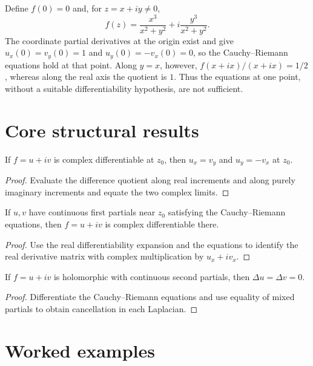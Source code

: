 \begin{example}\label{ex:iv02-expand-03}
Define \(f(0)=0\) and, for \(z=x+iy\ne0\),
\[
f(z)=\frac{x^3}{x^2+y^2}+i\frac{y^3}{x^2+y^2}.
\]
The coordinate partial derivatives at the origin exist and give \(u_x(0)=v_y(0)=1\) and \(u_y(0)=-v_x(0)=0\), so the Cauchy--Riemann equations hold at that point. Along \(y=x\), however, \(f(x+ix)/(x+ix)=1/2\), whereas along the real axis the quotient is \(1\). Thus the equations at one point, without a suitable differentiability hypothesis, are not sufficient.
\end{example}
\section{Core structural results}

\begin{theorem}\label{thm:iv02-01}
If $f=u+iv$ is complex differentiable at $z_0$, then $u_x=v_y$ and $u_y=-v_x$ at $z_0$.
\begin{proof}
Evaluate the difference quotient along real increments and along purely imaginary increments and equate the two complex limits.
\end{proof}
\end{theorem}

\begin{theorem}\label{thm:iv02-02}
If $u,v$ have continuous first partials near $z_0$ satisfying the Cauchy--Riemann equations, then $f=u+iv$ is complex differentiable there.
\begin{proof}
Use the real differentiability expansion and the equations to identify the real derivative matrix with complex multiplication by $u_x+iv_x$.
\end{proof}
\end{theorem}

\begin{theorem}[Harmonicity]\label{thm:iv02-03}
If $f=u+iv$ is holomorphic with continuous second partials, then $\Delta u=\Delta v=0$.
\begin{proof}
Differentiate the Cauchy--Riemann equations and use equality of mixed partials to obtain cancellation in each Laplacian.
\end{proof}
\end{theorem}

\section{Worked examples}


